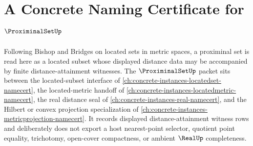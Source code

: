\chapter{A Concrete Naming Certificate for $\ProximinalSetUp$}
\label{ch:concrete-instances-proximinal-set-namecert}

Following Bishop and Bridges on located sets in metric spaces, a proximinal set is read here as a located subset whose displayed distance data may be accompanied by finite distance-attainment witnesses. The $\ProximinalSetUp$ packet sits between the located-subset interface of \autoref{ch:concrete-instances-locatedset-namecert}, the located-metric handoff of \autoref{ch:concrete-instances-locatedmetric-namecert}, the real distance seal of \autoref{ch:concrete-instances-real-namecert}, and the Hilbert or convex projection specialization of \autoref{ch:concrete-instances-metricprojection-namecert}. It records displayed distance-attainment witness rows and deliberately does not export a host nearest-point selector, quotient point equality, trichotomy, open-cover compactness, or ambient $\RealUp$ completeness.


